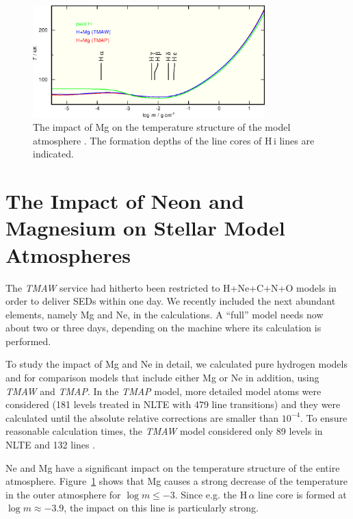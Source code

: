 \begin{figure}[ht!]\centering
\includegraphics[width=0.8\textwidth]{part9/Rauch_P24/p24_f2.eps}
\caption{The impact of Mg on the temperature structure of the model atmosphere
         \citep[$T_\mathrm{eff}=60\,\mathrm{kK}$, $\log g = 7$, solar abundances,][]{asplundetal2009}.
         The formation depths of the line cores of H\,{\sc i} lines are indicated.}
\label{fig:Tstruc}
\end{figure}


\section{The Impact of Neon and Magnesium on Stellar Model Atmospheres}
\label{sect:nemg}

The \emph{TMAW} service had hitherto been restricted to H+Ne+C+N+O models in order to deliver SEDs within one day. We recently included the next abundant elements, namely Mg and Ne, in the calculations. A ``full'' model needs now about two or three days, depending on the machine where its calculation is performed.

To study the impact of Mg and Ne in detail, we calculated pure hydrogen models and for comparison models that include either Mg or Ne in addition, using \emph{TMAW} and \emph{TMAP}. In the \emph{TMAP} model, more detailed model atoms were considered (181 levels treated in NLTE with 479 line transitions) and they were calculated until the absolute relative corrections are smaller than $10^{-4}$. To ensure reasonable calculation times,  the \emph{TMAW} model considered only 89 levels in NLTE and 132 lines \citep[cf\@.][]{rauchringat2012}.

Ne and Mg have a significant impact on the temperature structure of the entire atmosphere. Figure~\ref{fig:Tstruc} shows that Mg causes a strong decrease of the temperature in the outer atmosphere for $\log m \leq -3$. Since e.g\@. the H\,$\alpha$ line core is formed at $\log m \approx -3.9$, the impact on this line is particularly strong.

